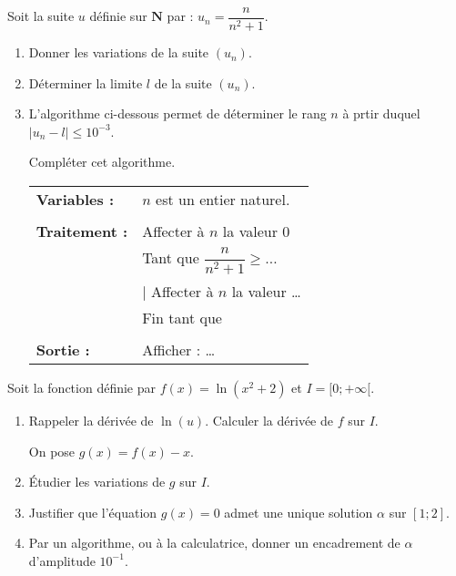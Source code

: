 \begin{question}[topic=suites,class=IG]
  Soit la suite $u$ définie sur $\mathbf{N}$ par : $u_n = \dfrac{n}{n^2 +
  1}$.
  \begin{enumerate}
    \item Donner les variations de la suite $(u_n)$.
    \item Déterminer la limite $l$ de la suite $(u_n)$.
    \item L'algorithme ci-dessous permet de déterminer le rang $n$ à prtir
      duquel $\lvert u_n -l \rvert \leqslant 10^{-3}$.

      Compléter cet algorithme.

      \begin{center}
        \begin{tabular}{p{3cm}p{5cm}}
          \textbf{Variables :}  & $n$ est un entier naturel. \\
                                & \\
          \textbf{Traitement :} & Affecter à $n$ la valeur 0 \\
                                & Tant que $\dfrac{n}{n^2 + 1} \geqslant \dots$ \\
                                & \phantom{xx} $\mid$ Affecter à $n$ la valeur … \\
                                & Fin tant que \\
                                & \\
          \textbf{Sortie :}     & Afficher : … \\
        \end{tabular}
      \end{center}
  \end{enumerate}
\end{question}

\begin{question}[topic=logarithme,class=IG]
  Soit la fonction définie par $f(x) = \ln(x^2 + 2)$ et $I = [ 0 ; +\infty
  [$.

  \begin{enumerate}
    \item Rappeler la dérivée de $\ln(u)$. Calculer la dérivée de $f$ sur
      $I$.

      On pose $g(x) = f(x) - x$.
    \item Étudier les variations de $g$ sur $I$.
    \item Justifier que l'équation $g(x) = 0$ admet une unique solution
      $\alpha$ sur $[1;2]$.
    \item Par un algorithme, ou à la calculatrice, donner un encadrement de
      $\alpha$ d'amplitude $10^{-1}$.
  \end{enumerate}
\end{question}

